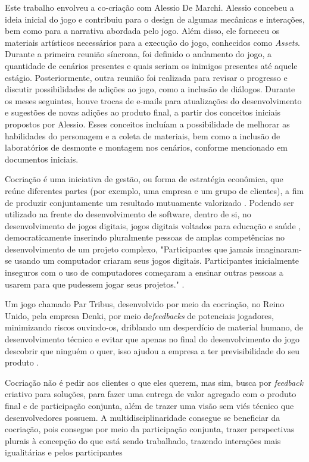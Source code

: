 \par
Este trabalho envolveu a co-criação com Alessio De Marchi. Alessio concebeu a ideia inicial do jogo e contribuiu para o design de algumas mecânicas e interações, bem como para a narrativa abordada pelo jogo. Além disso, ele forneceu os materiais artísticos necessários para a execução do jogo, conhecidos como \textit{Assets}. Durante a primeira reunião síncrona, foi definido o andamento do jogo, a quantidade de cenários presentes e quais seriam os inimigos presentes até aquele estágio. Posteriormente, outra reunião foi realizada para revisar o progresso e discutir possibilidades de adições ao jogo, como a inclusão de diálogos. Durante os meses seguintes, houve trocas de e-mails para atualizações do desenvolvimento e sugestões de novas adições ao produto final, a partir dos conceitos iniciais propostos por Alessio. Esses conceitos incluíam a possibilidade de melhorar as habilidades do personagem e a coleta de materiais, bem como a inclusão de laboratórios de desmonte e montagem nos cenários, conforme mencionado em documentos iniciais.
\par
Cocriação é uma iniciativa de gestão, ou forma de estratégia econômica, que reúne diferentes partes (por exemplo, uma empresa e um grupo de clientes), a fim de produzir conjuntamente um resultado mutuamente valorizado \cite{PRAHALAD20045}. Podendo ser utilizado na frente do desenvolvimento de software, dentro de si, no desenvolvimento de jogos digitais, jogos digitais voltados para educação e saúde \cite{IHC_Estendido}, democraticamente inserindo pluralmente pessoas de amplas competências no desenvolvimento de um projeto complexo, "Participantes que jamais imaginaram-se usando um computador criaram seus jogos digitais. Participantes inicialmente inseguros com o uso de computadores começaram a ensinar outras pessoas a usarem para que pudessem jogar seus projetos." \cite{IHC_Estendido}.
\par
Um jogo chamado Par Tribus, desenvolvido por meio da cocriação, no Reino Unido, pela empresa Denki, por meio de\textit{feedbacks} de potenciais jogadores, minimizando riscos ouvindo-os, driblando um desperdício de material humano, de desenvolvimento técnico e evitar que apenas no final do desenvolvimento do jogo descobrir que ninguém o quer, isso ajudou a empresa a ter previsibilidade do seu produto \cite{lowthorpe2013stop}.
\par
Cocriação não é pedir aos clientes o que eles querem, mas sim, busca por \textit{feedback} criativo para soluções, para fazer uma entrega de valor agregado com o produto final e de participação conjunta, além de trazer uma visão sem viés técnico que desenvolvedores possuem. A multidisciplinaridade consegue se beneficiar da cocriação, pois consegue por meio da participação conjunta, trazer perspectivas plurais à concepção do que está sendo trabalhado, trazendo interações mais igualitárias e pelos participantes \cite{rock2018multidisciplinary}
